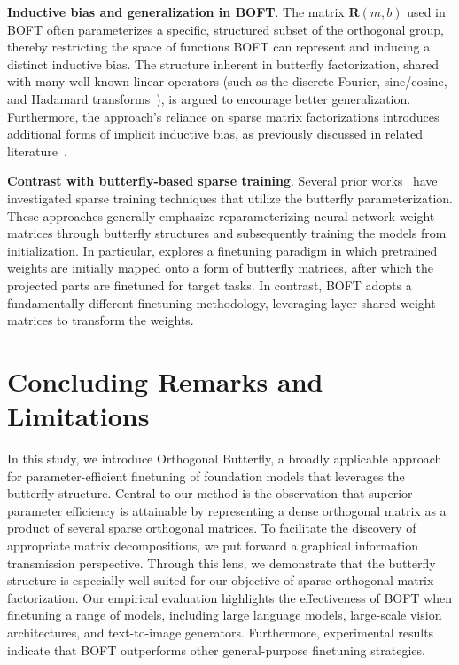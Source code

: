 \textbf{Inductive bias and generalization in BOFT}. The matrix $\bm{R}(m,b)$ used in BOFT often parameterizes a specific, structured subset of the orthogonal group, thereby restricting the space of functions BOFT can represent and inducing a distinct inductive bias. The structure inherent in butterfly factorization, shared with many well-known linear operators (such as the discrete Fourier, sine/cosine, and Hadamard transforms~\cite{dao2019kaleidoscope}), is argued to encourage better generalization. Furthermore, the approach’s reliance on sparse matrix factorizations introduces additional forms of implicit inductive bias, as previously discussed in related literature~\cite{gunasekar2017implicit,li2018algorithmic,liu2019neural}.

\textbf{Contrast with butterfly-based sparse training}. Several prior works~\cite{dao2019learning,dao2019kaleidoscope,chen2022pixelated,dao2022monarch} have investigated sparse training techniques that utilize the butterfly parameterization. These approaches generally emphasize reparameterizing neural network weight matrices through butterfly structures and subsequently training the models from initialization. In particular, \cite{dao2022monarch} explores a finetuning paradigm in which pretrained weights are initially mapped onto a form of butterfly matrices, after which the projected parts are finetuned for target tasks. In contrast, BOFT adopts a fundamentally different finetuning methodology, leveraging layer-shared weight matrices to transform the weights.



\section{Concluding Remarks and Limitations}

In this study, we introduce Orthogonal Butterfly, a broadly applicable approach for parameter-efficient finetuning of foundation models that leverages the butterfly structure. Central to our method is the observation that superior parameter efficiency is attainable by representing a dense orthogonal matrix as a product of several sparse orthogonal matrices. To facilitate the discovery of appropriate matrix decompositions, we put forward a graphical information transmission perspective. Through this lens, we demonstrate that the butterfly structure is especially well-suited for our objective of sparse orthogonal matrix factorization. Our empirical evaluation highlights the effectiveness of BOFT when finetuning a range of models, including large language models, large-scale vision architectures, and text-to-image generators. Furthermore, experimental results indicate that BOFT outperforms other general-purpose finetuning strategies.

